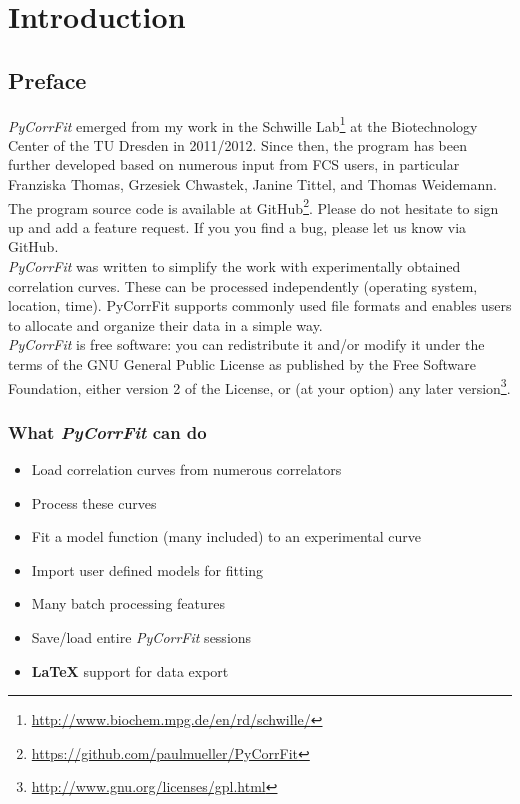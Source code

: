 \section{Introduction}
\label{sec:intro}
\subsection{Preface}
\label{sec:intro.prefa}
\textit{PyCorrFit} emerged from my work in the Schwille Lab\footnote{\url{http://www.biochem.mpg.de/en/rd/schwille/}} at the Biotechnology Center of the TU Dresden in 2011/2012. Since then, the program has been further developed based on numerous input from FCS users, in particular Franziska Thomas, Grzesiek Chwastek, Janine Tittel, and Thomas Weidemann. The program source code is available at GitHub\footnote{\url{https://github.com/paulmueller/PyCorrFit}}. Please do not hesitate to sign up and add a feature request. If you you find a bug, please let us know via GitHub.\\

\noindent \textit{PyCorrFit} was written to simplify the work with experimentally obtained correlation curves. These can be processed independently (operating system, location, time). PyCorrFit supports commonly used file formats and enables users to allocate and organize their data in a simple way.\\

\noindent \textit{PyCorrFit} is free software: you can redistribute it and/or modify it
under the terms of the GNU General Public License as published 
by the Free Software Foundation, either version 2 of the License, 
or (at your option) any later version\footnote{\url{http://www.gnu.org/licenses/gpl.html}}.

\subsubsection*{What \textit{PyCorrFit} can do}
\begin{itemize}
\item Load correlation curves from numerous correlators
\item Process these curves
\item Fit a model function (many included) to an experimental curve
\item Import user defined models for fitting
\item Many batch processing features
\item Save/load entire \textit{PyCorrFit} sessions
\item \textbf{\LaTeX} support for data export
\end{itemize}

